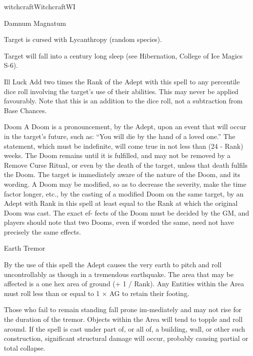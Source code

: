 \begin{College}[1.1]{witchcraft}{Witchcraft}{WI}
\begin{spell}[S-10]{Damnum Magnatum}
\begin{effects}
\begin{Description}
\begin{Itemize}
\item Target is cursed with Lycanthropy (random species).

\item Target will fall into a century long sleep (see Hibernation,
  College of Ice Magics S-6).
\end{Itemize}

\item[Ill Luck] Add two times the Rank of the Adept with this spell to
  any percentile dice roll involving the target’s use of their
  abilities.  This may never be applied favourably. Note that this is
  an addition to the dice roll, not a subtraction from Base Chances.

\item[Doom] A Doom is a pronouncement, by the Adept, upon an event
  that will occur in the target’s future, such as: “You will die by
  the hand of a loved one.”  The statement, which must be indefinite,
  will come true in not less than (24 - Rank) weeks. The Doom remains
  until it is fulfilled, and may not be removed by a Remove Curse
  Ritual, or even by the death of the target, unless that death
  fulfils the Doom.  The target is immediately aware of the nature of
  the Doom, and its wording. A Doom may be modified, so as to decrease
  the severity, make the time factor longer, etc., by the casting of a
  modified Doom on the same target, by an Adept with Rank in this
  spell at least equal to the Rank at which the original Doom was
  cast.  The exact ef- fects of the Doom must be decided by the GM,
  and players should note that two Dooms, even if worded the same,
  need not have precisely the same effects.
\end{Description}
\end{effects}
\end{spell}

\begin{spell}[S-11]{Earth Tremor}

\begin{effects}
By the use of this spell the Adept causes the very earth to pitch and
roll uncontrollably as though in a tremendous earthquake.  The area
that may be affected is a one hex area of ground (+ 1 / Rank). Any
Entities within the Area must roll less than or equal to 1 × AG to
retain their footing.

Those who fail to remain standing fall prone im-mediately and may not
rise for the duration of the tremor. Objects within the Area will tend
to topple and roll around. If the spell is cast under part of, or all
of, a building, wall, or other such construction, significant
structural damage will occur, probably causing partial or total
collapse.
\end{effects}
\end{spell}


\end{College}
